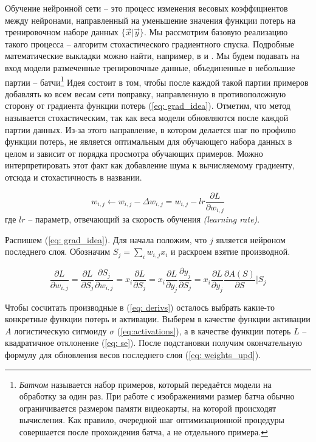 \indent
\indent
Обучение нейронной сети -- это процесс изменения весовых
коэффициентов между нейронами, направленный на уменьшение
значения функции потерь на тренировочном наборе данных $\{ \vec{x} | \vec{y} \}$. 
Мы рассмотрим базовую реализацию такого процесса -- алгоритм 
стохастического градиентного спуска. Подробные математические выкладки
можно найти, например, в \cite{deeplearningbook} и \cite{dl_nikolenko}.
Мы будем подавать на вход модели
размеченные тренировочные данные, объединенные в  небольшие партии 
-- батчи\footnote{\textit{Батчом} называется набор примеров, который передаётся
модели на обработку за один раз. При работе с изображениями размер батча 
обычно ограничивается размером памяти видеокарты,
на которой происходят вычисления.
Как правило, очередной шаг оптимизационной процедуры совершается после
прохождения батча, а не отдельного примера.}
Идея состоит в том, чтобы после каждой такой партии примеров
добавлять ко всем весам сети поправку, направленную в противоположную
сторону от градиента функции потерь
(\ref{eq: grad_idea}). 
Отметим, что метод называется стохастическим, так как веса 
модели обновляются после каждой партии данных. Из-за этого
направление, в котором делается шаг по профилю функции потерь,
не является оптимальным для обучающего набора данных в целом и зависит
от порядка просмотра обучающих примеров.
Можно интерпретировать этот факт как добавление шума
к вычисляемому градиенту, отсюда и стохастичность в названии.


\begin{equation}\label{eq: grad_idea}
    w_{i, j} \leftarrow w_{i, j} - \Delta w_{i,j} = w_{i, j} - lr \frac{\partial L}{\partial w_{i, j}}
\end{equation}
где $lr$ -- параметр, отвечающий за скорость обучения \textit{(learning rate)}.


\indent
\indent
Распишем (\ref{eq: grad_idea}). 
Для начала положим, что $j$ является 
нейроном последнего слоя. Обозначим $S_{j} = \sum_{i} w_{i, j} x_{i}$ и
раскроем взятие производной.

\begin{equation}\label{eq: derivs}
    \frac{\partial L}{\partial w_{i, j}} = 
    \frac{\partial L}{\partial S_j} \frac{\partial S_j}{\partial w_{i, j}} =
    x_i \frac{\partial L}{\partial S_j} =
    x_i \frac{\partial L}{\partial y_j} \frac{\partial y_j}{\partial S_j} =
    x_i \frac{\partial L}{\partial y_j}  \frac{\partial A(S)}{\partial S} | S_j
\end{equation}

Чтобы сосчитать производные в (\ref{eq: derivs}) осталось выбрать какие-то конкретные
функции потерь и активации. Выберем в качестве функции активации $A$ 
логистическую сигмоиду $\sigma$ (\ref{eq:activations}), а в качестве функции потерь
$L$ -- квадратичное отклонение (\ref{eq: se}). После подстановки получим
окончательную формулу для обновления
весов последнего слоя (\ref{eq: weights_upd}).

